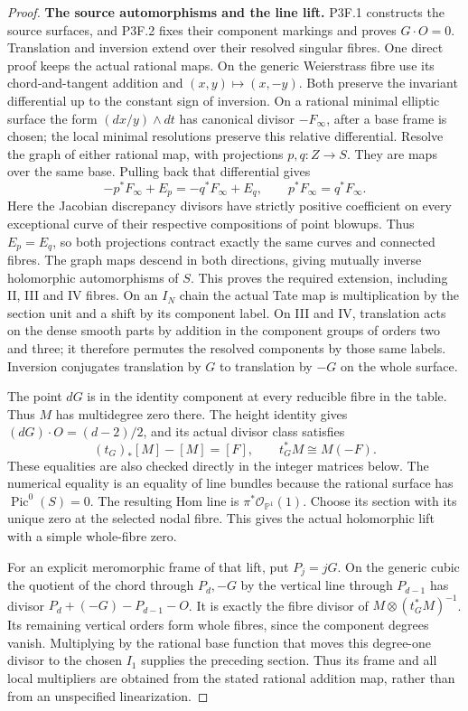 \begin{proof}
\par\medskip\noindent\textbf{The source automorphisms and the line lift.}\enspace
P3F.1 constructs the source surfaces, and P3F.2 fixes their component
markings and proves \(G\cdot O=0\).  Translation and inversion
extend over their resolved singular fibres.  One direct proof keeps
the actual rational maps.  On the generic Weierstrass fibre use its
chord-and-tangent addition and \((x,y)\mapsto(x,-y)\).  Both preserve
the invariant differential up to the constant sign of inversion.
On a rational minimal elliptic surface the form
\((dx/y)\wedge dt\) has canonical divisor \(-F_\infty\), after a
base frame is chosen; the local minimal resolutions preserve this
relative differential.  Resolve the graph of either rational map,
with projections \(p,q:Z\to S\).  They are maps over the same base.
Pulling back that differential gives
\[
 -p^*F_\infty+E_p=-q^*F_\infty+E_q,
 \qquad p^*F_\infty=q^*F_\infty.
\]
Here the Jacobian discrepancy divisors have strictly positive
coefficient on every exceptional curve of their respective
compositions of point blowups.  Thus \(E_p=E_q\), so both
projections contract exactly the same curves and connected fibres.
The graph maps descend in both directions, giving mutually inverse
holomorphic automorphisms of \(S\).  This proves the required
extension, including II, III and IV fibres.  On an \(I_N\) chain
the actual Tate map is multiplication by the section unit and a
shift by its component label.  On III and IV, translation acts on
the dense smooth parts by addition in the component groups of
orders two and three; it therefore permutes the resolved components
by those same labels.  Inversion conjugates translation by \(G\)
to translation by \(-G\) on the whole surface.

The point \(dG\) is in the identity component at every reducible
fibre in the table.  Thus \(M\) has multidegree zero there.
The height identity gives
\((dG)\cdot O=(d-2)/2\), and its actual divisor class satisfies
\[
 (t_G)_*[M]-[M]=[F],\qquad t_G^*M\cong M(-F).           \tag{P3K.22.2}
\]
These equalities are also checked directly in the integer matrices
below.  The numerical equality is an equality of line bundles
because the rational surface has \(\operatorname{Pic}^0(S)=0\).
The resulting Hom line is \(\pi^*\mathcal O_{\mathbb P^1}(1)\).
Choose its section with its unique zero at the selected nodal fibre.
This gives the actual holomorphic lift with a simple whole-fibre
zero.

For an explicit meromorphic frame of that lift, put \(P_j=jG\).
On the generic cubic the quotient of the chord through
\(P_d,-G\) by the vertical line through \(P_{d-1}\) has divisor
\(P_d+(-G)-P_{d-1}-O\).  It is exactly the fibre divisor of
\(M\otimes(t_G^*M)^{-1}\).  Its remaining vertical orders form
whole fibres, since the component degrees vanish.  Multiplying by
the rational base function that moves this degree-one divisor to the
chosen \(I_1\) supplies the preceding section.  Thus its frame and
all local multipliers are obtained from the stated rational addition
map, rather than from an unspecified linearization.


\end{proof}
